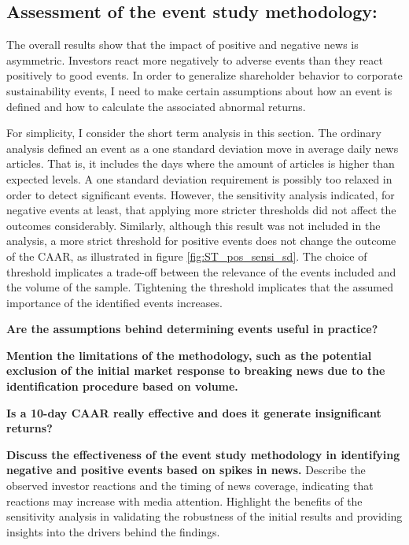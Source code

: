 
\subsection{Assessment of the event study methodology:}

The overall results show that the impact of positive and negative news is asymmetric. Investors react more negatively to adverse events than they react positively to good events. In order to generalize shareholder behavior to corporate sustainability events, I need to make certain assumptions about how an event is defined and how to calculate the associated abnormal returns. 

For simplicity, I consider the short term analysis in this section. The ordinary analysis defined an event as a one standard deviation move in average daily news articles. That is, it includes the days where the amount of articles is higher than expected levels. A one standard deviation requirement is possibly too relaxed in order to detect significant events. However, the sensitivity analysis indicated, for negative events at least, that applying more stricter thresholds did not affect the outcomes considerably. Similarly, although this result was not included in the analysis, a more strict threshold for positive events does not change the outcome of the CAAR, as illustrated in figure \ref{fig:ST_pos_sensi_sd}. The choice of threshold implicates a trade-off between the relevance of the events included and the volume of the sample. Tightening the threshold implicates that the assumed importance of the identified events increases.




\textbf{Are the assumptions behind determining events useful in practice?}

\textbf{Mention the limitations of the methodology, such as the potential exclusion of the initial market response to breaking news due to the identification procedure based on volume.}

\textbf{Is a 10-day CAAR really effective and does it generate insignificant returns?}

\textbf{Discuss the effectiveness of the event study methodology in identifying negative and positive events based on spikes in news.}
Describe the observed investor reactions and the timing of news coverage, indicating that reactions may increase with media attention. Highlight the benefits of the sensitivity analysis in validating the robustness of the initial results and providing insights into the drivers behind the findings.




